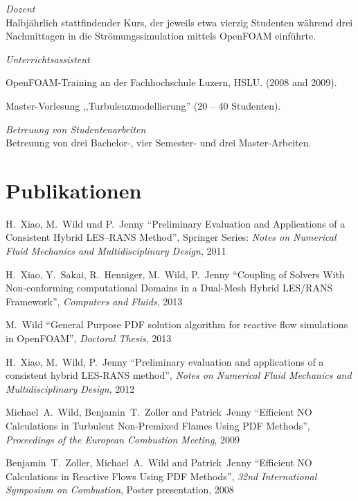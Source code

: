 \documentclass[line,11pt,a4paper]{../resume}
\begin{document}
\begin{resume}
\textsl{Dozent}\\
Halbjährlich stattfindender Kurs, der jeweils etwa vierzig Studenten während
drei Nachmittagen in die Strömungssimulation mittels OpenFOAM einführte.

\textsl{Unterrichtsassistent}
\begin{list2}
  \item OpenFOAM-Training an der Fachhochschule Luzern, HSLU. (2008 and 2009).
  \item Master-Vorlesung ,,Turbulenzmodellierung'' (20 -- 40 Studenten).
\end{list2}

\textsl{Betreuung von Studentenarbeiten}\\
Betreuung von drei Bachelor-, vier Semester- und drei Master-Arbeiten.

\section{\mysidestyle Publikationen}\vspace{2mm}
H.~Xiao, M.~Wild und P.~Jenny ``Preliminary Evaluation and
Applications of a Consistent Hybrid LES--RANS Method'', Springer Series:
\textsl{Notes on Numerical Fluid Mechanics and Multidisciplinary Design}, 2011

\vspace{-2mm}
H.~Xiao, Y.~Sakai, R.~Henniger, M.~Wild, P.~Jenny
``Coupling of Solvers With Non-conforming computational Domains in a Dual-Mesh
Hybrid LES/RANS Framework'', \textsl{Computers and Fluids}, 2013

M.~Wild
``General Purpose PDF solution algorithm for reactive flow simulations in
OpenFOAM'', \textsl{Doctoral Thesis}, 2013

\vspace{-2mm}
H.~Xiao, M.~Wild, P.~Jenny
``Preliminary evaluation and applications of a consistent hybrid LES-RANS
method'', \textsl{Notes on Numerical Fluid Mechanics and Multidisciplinary
Design}, 2012

\vspace{-2mm}
Michael~A.~Wild, Benjamin~T.~Zoller and Patrick~Jenny
``Efficient $\mathrm{NO}$ Calculations in Turbulent Non-Premixed Flames Using
PDF Methods'', \textsl{Proceedings of the European Combustion Meeting}, 2009

\vspace{-2mm}
Benjamin~T.~Zoller, Michael~A.~Wild and Patrick~Jenny
``Efficient $\mathrm{NO}$ Calculations in Reactive Flows Using PDF Methods'',
\textsl{32nd International Symposium on Combustion}, Poster presentation, 2008



\end{resume}
\end{document}
